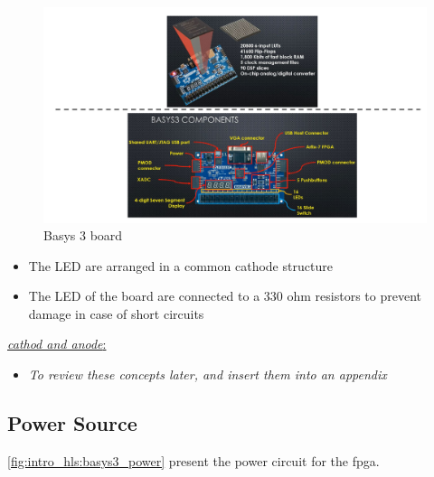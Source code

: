 \begin{figure}[h]
\centering
\includegraphics[scale=0.7,frame]{Figures/intro_hls/basys3_board}
\caption{Basys 3 board}
\label{fig:intro_hls:basys3_board}
\end{figure} 

\begin{itemize}

\item The LED are arranged in a common cathode structure

\item The LED of the board are connected to a 330 ohm resistors to prevent damage in case of short circuits

\end{itemize}

\underline{\textit{cathod and anode}:} 

\begin{itemize}

\item \textit{To review these concepts later, and insert them into an appendix}

\end{itemize}

\newpage
\subsection{Power Source}

\autoref{fig:intro_hls:basys3_power} present the power circuit for the fpga.


